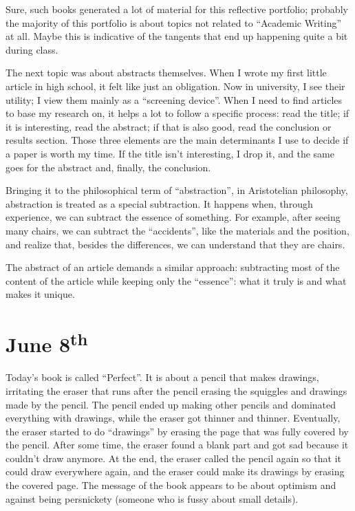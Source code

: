 Sure, such books generated a lot of material for this reflective portfolio; probably the majority of this portfolio is about topics not related to ``Academic Writing'' at all. Maybe this is indicative of the tangents that end up happening quite a bit during class.

The next topic was about abstracts themselves. When I wrote my first little article in high school, it felt like just an obligation. Now in university, I see their utility; I view them mainly as a ``screening device''. When I need to find articles to base my research on, it helps a lot to follow a specific process: read the title; if it is interesting, read the abstract; if that is also good, read the conclusion or results section. Those three elements are the main determinants I use to decide if a paper is worth my time. If the title isn't interesting, I drop it, and the same goes for the abstract and, finally, the conclusion.

Bringing it to the philosophical term of ``abstraction'', in Aristotelian philosophy, abstraction is treated as a special subtraction. It happens when, through experience, we can subtract the essence of something. For example, after seeing many chairs, we can subtract the ``accidents'', like the materials and the position, and realize that, besides the differences, we can understand that they are chairs.

The abstract of an article demands a similar approach: subtracting most of the content of the article while keeping only the ``essence'': what it truly is and what makes it unique.


\section[June 8th]{June 8\textsuperscript{th}}

Today's book is called ``Perfect''. It is about a pencil that makes drawings, irritating the eraser that runs after the pencil erasing the squiggles and drawings made by the pencil. The pencil ended up making other pencils and dominated everything with drawings, while the eraser got thinner and thinner. Eventually, the eraser started to do ``drawings'' by erasing the page that was fully covered by the pencil. After some time, the eraser found a blank part and got sad because it couldn't draw anymore. At the end, the eraser called the pencil again so that it could draw everywhere again, and the eraser could make its drawings by erasing the covered page. The message of the book appears to be about optimism and against being persnickety (someone who is fussy about small details).

